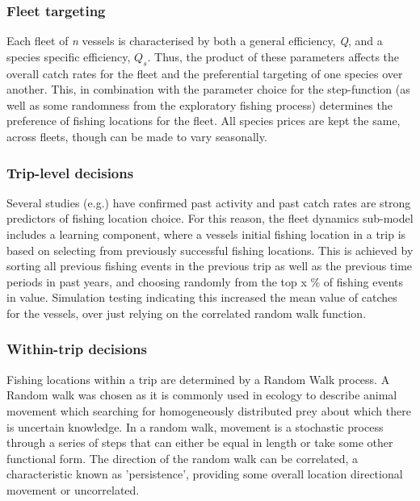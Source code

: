 \documentclass[review]{elsarticle}
\begin{document}
\subsubsection{Fleet targeting}

Each fleet of \textit{n} vessels is characterised by both a general efficiency,
\textit{Q}, and a species specific efficiency, ${Q_{s}}$.  Thus, the product of
these parameters affects the overall catch rates for the fleet and the
preferential targeting of one species over another.  This, in combination with
the parameter choice for the step-function (as well as some randomness from the
exploratory fishing process) determines the preference of fishing locations for
the fleet.  All species prices are kept the same, across fleets, though can be
made to vary seasonally.  

\subsubsection{Trip-level decisions}

Several studies (e.g.\cite{Hutton2004, Tidd2012, Girardin2015}) have confirmed
past activity and past catch rates are strong predictors of fishing location
choice. For this reason, the fleet dynamics sub-model includes a learning
component, where a vessels initial fishing location in a trip is based on
selecting from previously successful fishing locations. This is achieved by
sorting all previous fishing events in the previous trip as well as the
previous time periods in past years, and choosing randomly from the top x \% of
fishing events in value.  Simulation testing indicating this increased the mean
value of catches for the vessels, over just relying on the correlated random
walk function. 

\subsubsection{Within-trip decisions}

Fishing locations within a trip are determined by a Random Walk process. A
Random walk was chosen as it is commonly used in ecology to describe animal
movement which searching for homogeneously distributed prey about which there
is uncertain knowledge. In a random walk, movement is a stochastic process
through a series of steps that can either be equal in length or take some other
functional form.  The direction of the random walk can be correlated, a
characteristic known as 'persistence', providing some overall location
directional movement \cite{Codling2008} or uncorrelated. \\
\end{document}
